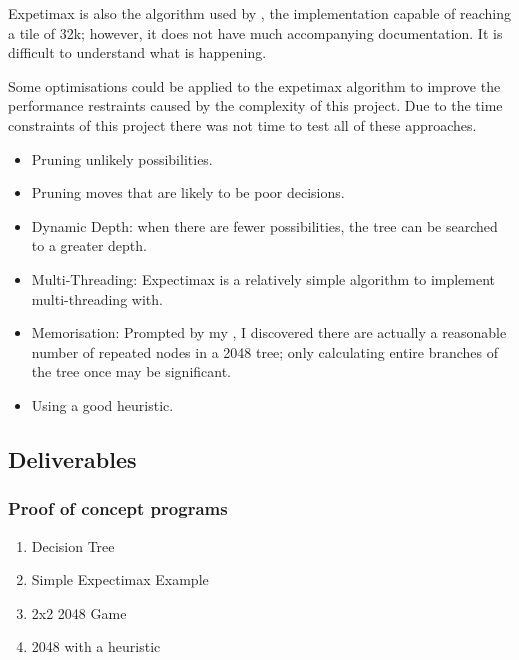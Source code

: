 \documentclass{article}
\begin{document}
Expetimax is also the algorithm used by \cite{_16k2048ai}, the implementation capable of reaching a tile of 32k; however, it does not have much accompanying documentation. It is difficult to understand what is happening.

Some optimisations could be applied to the expetimax algorithm to improve the performance restraints caused by the complexity of this project. Due to the time constraints of this project there was not time to test all of these approaches.
\begin{itemize}
    \item Pruning unlikely possibilities.
    \item Pruning moves that are likely to be poor decisions.
    \item Dynamic Depth: when there are fewer possibilities, the tree can be searched to a greater depth.
    \item Multi-Threading: Expectimax is a relatively simple algorithm to implement multi-threading with.
    \item Memorisation: Prompted by my \cite{_16k2048ai}, I discovered there are actually a reasonable number of repeated nodes in a 2048 tree; only calculating entire branches of the 
    tree once may be significant.
    \item Using a good heuristic.
\end{itemize}

\subsection{Deliverables}
\label{subsec:deliverable}
\subsubsection{Proof of concept programs}
\begin{enumerate}
    \item Decision Tree
    \item Simple Expectimax Example
    \item 2x2 2048 Game
    \item 2048 with a heuristic
\end{enumerate}
\end{document}
